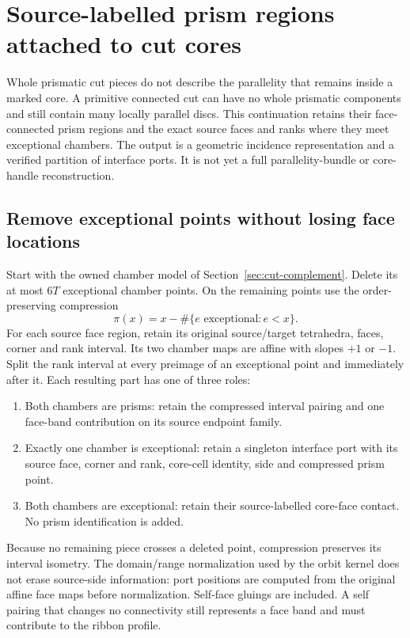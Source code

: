 \section{Source-labelled prism regions attached to cut cores}
\label{sec:prism-interfaces}

Whole prismatic cut pieces do not describe the parallelity that remains
inside a marked core. A primitive connected cut can have no whole prismatic
components and still contain many locally parallel discs. This continuation
retains their face-connected prism regions and the exact source faces and
ranks where they meet exceptional chambers. The output is a geometric
incidence representation and a verified partition of interface ports.
It is not yet a full parallelity-bundle or core-handle reconstruction.

\subsection{Remove exceptional points without losing face locations}

Start with the owned chamber model of Section~\ref{sec:cut-complement}.
Delete its at most $6T$ exceptional chamber points. On the remaining
points use the order-preserving compression
\[
             \pi(x)=x-\#\{e\text{ exceptional}:e<x\}.
\]
For each source face region, retain its original source/target tetrahedra,
faces, corner and rank interval. Its two chamber maps are affine with slopes
$+1$ or $-1$. Split the rank interval at every preimage of an exceptional
point and immediately after it. Each resulting part has one of three roles:
\begin{enumerate}
\item Both chambers are prisms: retain the compressed interval pairing and
  one face-band contribution on its source endpoint family.
\item Exactly one chamber is exceptional: retain a singleton interface port
  with its source face, corner and rank, core-cell identity, side and compressed
  prism point.
\item Both chambers are exceptional: retain their source-labelled core-face
  contact. No prism identification is added.
\end{enumerate}

Because no remaining piece crosses a deleted point, compression preserves
its interval isometry. The domain/range normalization used by the orbit
kernel does not erase source-side information: port positions are computed
from the original affine face maps before normalization. Self-face gluings
are included. A self pairing that changes no connectivity still represents
a face band and must contribute to the ribbon profile.


